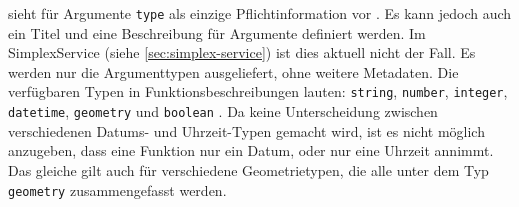 

 sieht für Argumente \texttt{type} als einzige Pflichtinformation vor . Es kann jedoch auch ein Titel und eine Beschreibung für Argumente definiert werden.  Im SimplexService (siehe \ref{sec:simplex-service}) ist dies aktuell nicht der Fall. Es werden nur die Argumenttypen ausgeliefert, ohne weitere Metadaten. Die verfügbaren Typen in Funktionsbeschreibungen lauten: \texttt{string}, \texttt{number}, \texttt{integer}, \texttt{datetime}, \texttt{geometry} und \texttt{boolean} . Da keine Unterscheidung zwischen verschiedenen Datums- und Uhrzeit-Typen gemacht wird, ist es nicht möglich anzugeben, dass eine Funktion nur ein Datum, oder nur eine Uhrzeit annimmt. Das gleiche gilt auch für verschiedene Geometrietypen, die alle unter dem Typ \texttt{geometry} zusammengefasst werden.
